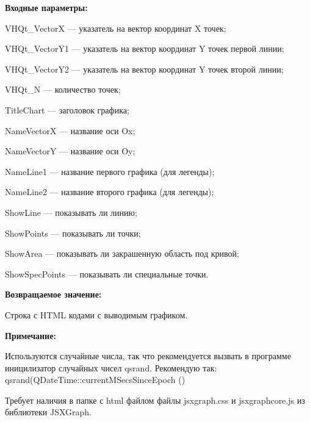 \textbf{Входные параметры:}
 
    VHQt\_VectorX --- указатель на вектор координат X точек;
 
    VHQt\_VectorY1 --- указатель на вектор координат Y точек первой линии;
 
    VHQt\_VectorY2 --- указатель на вектор координат Y точек второй линии;
 
    VHQt\_N --- количество точек;
 
    TitleChart --- заголовок графика;
 
    NameVectorX --- название оси Ox;
 
    NameVectorY --- название оси Oy;
 
    NameLine1 --- название первого графика (для легенды);
 
    NameLine2 --- название второго графика (для легенды);
 
    ShowLine --- показывать ли линию;
 
    ShowPoints --- показывать ли точки;
 
    ShowArea --- показывать ли закрашенную область под кривой;
 
    ShowSpecPoints --- показывать ли специальные точки.

\textbf{Возвращаемое значение:}

Строка с HTML кодами с выводимым графиком.

\textbf{Примечание:}

Используются случайные числа, так что рекомендуется вызвать в программе иницилизатор случайных чисел qsrand. Рекомендую так: qsrand(QDateTime::currentMSecsSinceEpoch () %

Требует наличия в папке с html файлом файлы jsxgraph.css и jsxgraphcore.js из библиотеки JSXGraph.